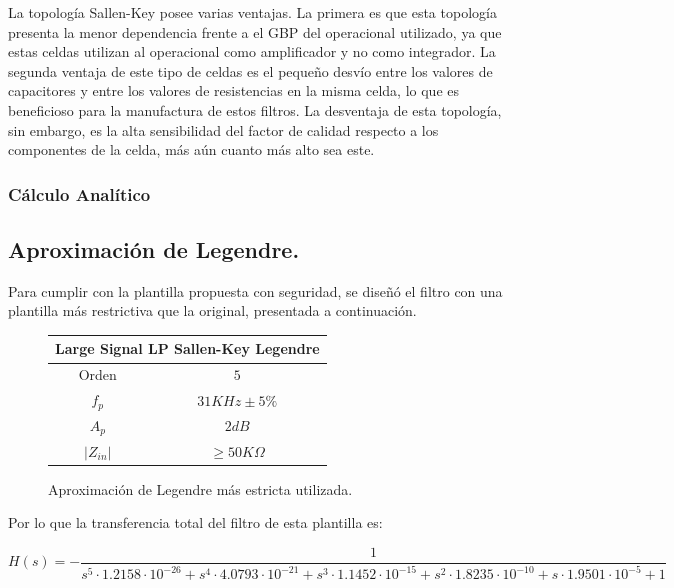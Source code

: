 La topología Sallen-Key posee varias ventajas. La primera es que esta topología presenta la menor dependencia frente a el GBP del operacional utilizado, ya que estas celdas utilizan al operacional como amplificador y no como integrador. La segunda ventaja de este tipo de celdas es el pequeño desvío entre los valores de capacitores y entre los valores de resistencias en la misma celda, lo que es beneficioso para la manufactura de estos filtros. La desventaja de esta topología, sin embargo, es la alta sensibilidad del factor de calidad respecto a los componentes de la celda, más aún cuanto más alto sea este. 

\subsubsection{Cálculo Analítico}


\subsection{Aproximación de Legendre.}

Para cumplir con la plantilla propuesta con seguridad, se diseñó el filtro con una plantilla más restrictiva que la original, presentada a continuación.

\begin{figure}[H]
		\begin{table}[H]
			\centering
			\begin{tabular}{@{}cc@{}}
			\toprule
			\multicolumn{2}{c}{Large Signal LP Sallen-Key Legendre} \\ \midrule
			Orden & $5$ \\
			$f_p$ & $31KHz \pm 5\%$ \\
			$A_p$ & $2dB$ \\
			$\left| Z_{in}\right|$ & $\geq 50K\Omega$ \\ \bottomrule
			\end{tabular}
		\end{table}
		\caption{Aproximación de Legendre más estricta utilizada.}
		\label{aprox_leg_est}
\end{figure}

Por lo que la transferencia total del filtro de esta plantilla es:

\begin{equation}
H(s) = -\frac{1}{s^5\cdot 1.2158\cdot10^{-26}+s^4\cdot 4.0793\cdot10^{-21}+s^3\cdot 1.1452\cdot10^{-15}+s^2\cdot 1.8235\cdot10^{-10}+s \cdot 1.9501\cdot10^{-5}+1}	
\label{hslegteo}
\end{equation}

